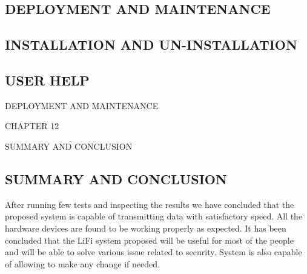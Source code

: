 \documentclass[12pt,a4paper]
{article}
\numberwithin{table}{section}
\begin{document}
{{{{{{{{\begin{center}
\section{DEPLOYMENT AND MAINTENANCE}
\end{center}

\subsection{INSTALLATION AND UN-INSTALLATION}

\subsection{USER HELP}



DEPLOYMENT AND MAINTENANCE




\newpage
\begin{minipage}{15cm}


\vspace{4 in}
 \begin{center} 
\begin{Huge}
CHAPTER 12


\vspace{0.5 in}

SUMMARY AND CONCLUSION
\end{Huge}

\end{center}
\end{minipage}

\newpage
\begin{center}
\section{SUMMARY AND CONCLUSION}
\end{center}
 {\setlength{\baselineskip}{1.0\baselineskip} 		
  \vspace{0.1in}	
 



\hspace{10 pt} 
After running few tests and inspecting the results we have concluded that the proposed system is capable of transmitting data with satisfactory speed. All the hardware devices are found to be working properly as expected. It has been concluded that the LiFi system proposed will be useful for most of the people and will be able to solve various issue related to security. System is also capable of allowing to make any change if needed. 
\\






}}}}}}}}}
\end{document}
